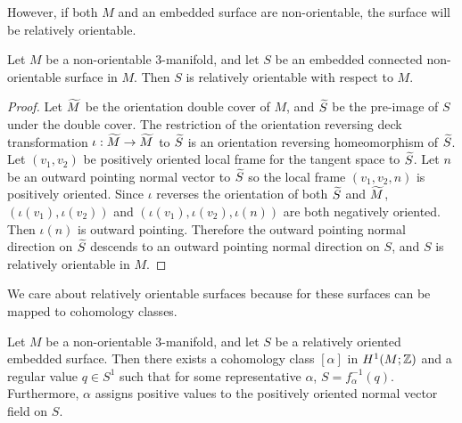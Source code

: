 However, if both $M$ and an embedded surface are non-orientable, the surface will be relatively orientable.
\begin{prop}
  \label{prop:relative-orientability}
  Let $M$ be a non-orientable $3$-manifold, and let $S$ be an embedded connected non-orientable surface in $M$.
  Then $S$ is relatively orientable with respect to $M$.
\end{prop}
\begin{proof}
  Let $\widetilde{M}$ be the orientation double cover of $M$, and $\widetilde{S}$ be the pre-image of $S$ under the double cover. The
  restriction of the orientation reversing deck transformation $\iota:\widetilde{M}\rightarrow\widetilde{M}$ to $\widetilde{S}$ is an orientation reversing homeomorphism of $\widetilde{S}$.
  Let $(v_1, v_2)$ be positively oriented local frame for the tangent space to $\widetilde{S}$. Let $n$ be an outward pointing normal vector to $\widetilde{S}$ so the local frame $(v_1, v_2, n)$ is positively oriented. Since $\iota$ reverses the orientation of both $\widetilde{S}$ and $\widetilde{M}$, $(\iota(v_1), \iota(v_2))$ and $(\iota(v_1), \iota(v_2), \iota(n))$ are both negatively oriented. Then $\iota(n)$ is outward pointing. 
  Therefore the outward pointing normal direction on $\widetilde{S}$ descends to an outward pointing normal direction on $S$, and $S$ is relatively orientable in $M$.
\end{proof}

We care about relatively orientable surfaces because for these surfaces can be mapped to cohomology classes.
\begin{thm}
  \label{thm:Poincare-duality}
  Let $M$ be a non-orientable $3$-manifold, and let $S$ be a relatively oriented embedded
  surface. Then there exists a cohomology class $[\alpha]$ in $H^1(M; \mathbb{Z})$ and a regular value $q\in S^1$ such that for some
  representative $\alpha$, $S=f_{\alpha}^{-1}(q)$. Furthermore, $\alpha$ assigns positive values to the positively oriented normal vector
  field on $S$.
\end{thm}

